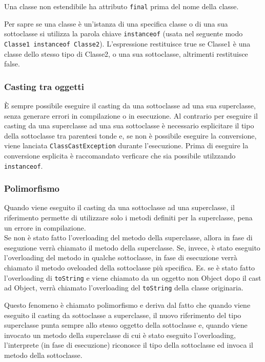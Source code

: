 \documentclass[a4paper]{article}
\begin{document}
Una classe non estendibile ha attributo \verb|final| prima del nome della classe.

Per sapre se una classe è un'istanza di una specifica classe o di una sua sottoclasse si utilizza la parola chiave \verb|instanceof|
(usata nel seguente modo \verb|Classe1 instanceof Classe2|). L'espressione restituisce true se Classe1 è una classe dello stesso tipo di Classe2, o una sua
sottoclasse, altrimenti restituisce false.

\newpage


\subsubsection*{Casting tra oggetti}
È sempre possibile eseguire il casting da una sottoclasse ad una sua superclasse, senza generare errori in compilazione o in esecuzione.
Al contrario per eseguire il casting da una superclasse ad una sua sottoclasse è necessario esplicitare il tipo della sottoclasse tra
parentesi tonde e, se non è possibile eseguire la conversione, viene lanciata \verb|ClassCastException| durante l'esecuzione.
Prima di eseguire la conversione esplicita è raccomandato verficare che sia possibile utilzzando \verb|instanceof|.

\subsubsection*{Polimorfismo}
Quando viene eseguito il casting da una sottoclasse ad una superclasse, il  riferimento permette di utilizzare solo i metodi
definiti per la superclasse, pena un errore in compilazione. \\
Se non è stato fatto l'overloading del metodo della superclasse, allora in fase di eseguzione verrà chiamato il metodo della superclasse.
Se, invece, è stato eseguito l'overloading del metodo in qualche sottoclasse, in fase di esecuzione verrà chiamato il metodo oveloaded
della sottoclasse più specifica.
Es. se è stato fatto l'overloading di \verb|toString| e viene chiamato da un oggetto non Object dopo il cast ad Object, verrà chiamato
l'overloading del \verb|toString| della classe originaria.

Questo fenomeno è chiamato polimorfismo e deriva dal fatto che quando viene eseguito il casting da sottoclasse a superclasse, il nuovo
riferimento del tipo superclasse punta sempre allo stesso oggetto della sottoclasse e, quando viene invocato un metodo della superclasse
di cui è stato eseguito l'overloading, l'interprete (in fase di esecuzione) riconosce il tipo della sottoclasse ed invoca il metodo
della sottoclasse.
\end{document}
